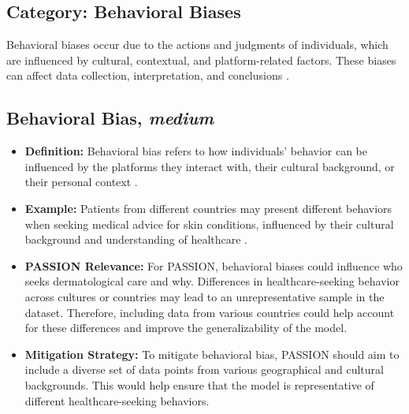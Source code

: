 \begin{refsection}
		\section{\textbf{Category:} Behavioral Biases}
		Behavioral biases occur due to the actions and judgments of individuals, which are influenced by cultural, contextual, and platform-related factors. These biases can affect data collection, interpretation, and conclusions \autocite{M120_Olteanu_2019}.
		
		\subsection{Behavioral Bias, \textit{medium}}
		\begin{itemize}
			\item \textbf{Definition:} Behavioral bias refers to how individuals' behavior can be influenced by the platforms they interact with, their cultural background, or their personal context \autocite{M120_Olteanu_2019}.
			\item \textbf{Example:} Patients from different countries may present different behaviors when seeking medical advice for skin conditions, influenced by their cultural background and understanding of healthcare \autocite{M120_Olteanu_2019}.
			\item \textbf{PASSION Relevance:} For PASSION, behavioral biases could influence who seeks dermatological care and why. Differences in healthcare-seeking behavior across cultures or countries may lead to an unrepresentative sample in the dataset. Therefore, including data from various countries could help account for these differences and improve the generalizability of the model.
			\item \textbf{Mitigation Strategy:} To mitigate behavioral bias, PASSION should aim to include a diverse set of data points from various geographical and cultural backgrounds. This would help ensure that the model is representative of different healthcare-seeking behaviors.
		\end{itemize}
		

\end{refsection}
